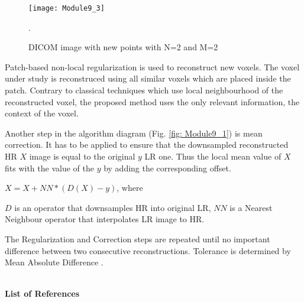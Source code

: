 \begin{figure}[H]
\centering{}\texttt{[image: Module9\_3]}\caption{DICOM image with new points with N=2 and M=2}. 
\label{fig: Module9_3}
\end{figure}

Patch-based non-local regularization is used to reconstruct new voxels. The voxel under study is reconstruced using all similar voxels which are placed inside the patch. Contrary to classical techniques which use local neighbourhood of the reconstructed voxel, the proposed method uses the only relevant information, the context of the voxel.

Another step in the algorithm diagram (Fig. \ref{fig: Module9_1}) is mean correction. It has to be applied to ensure that the downsampled reconstructed HR $X$ image is equal to the original $y$ LR one. Thus the local mean value of $X$ fits with the value of the $y$ by adding the corresponding offset.

\centerline{$X=X+NN*(D(X)-y)$, where}

$D$ is an operator that downsamples HR into original LR,
\newline $NN$ is a Nearest Neighbour operator that interpolates LR image to HR.

The Regularization and Correction steps are repeated until no important difference between two consecutive reconstructions. Tolerance is determined by Mean Absolute Difference .

\hfill{}\\
\textbf{List of References}\\
\cite{9art1}
\cite{9art2}
